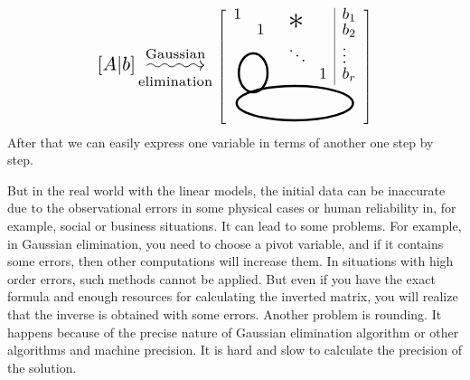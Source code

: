     \[
        \scalebox{1.5}{$[A | b] \overset{\text{Gaussian}}{ \underset{\text{elimination}}{\xymatrix@C=3em{{}\ar@{~>}[r]&{}}}}$}
        \left[\begin{tabular}{clp{0.1cm}p{0.1cm}l}
            \multicolumn{1}{l}{\scalebox{1.25}{$1$}}        &         &\multicolumn{1}{l}{\multirow{2}{*}{\scalebox{2.5}{$\mathlarger{*}$}}}  & \multicolumn{1}{c|}{} & \scalebox{1.25}{$b_1$}    \\
\multicolumn{1}{l}{}         & \scalebox{1.25}{$1$}       & \multicolumn{1}{c}{} & \multicolumn{1}{c|}{}                   & \scalebox{1.25}{$b_2$}    \\
            \multicolumn{2}{c}{\multirow{2}{*}{
                \begin{tikzpicture}[x=0.75pt,y=0.75pt,yscale=-1,xscale=1]
                    \draw  [line width=1.75]  (304.32,138.5) .. controls (312.66,138.5) and (319.43,147.68) .. (319.43,159) .. controls (319.43,170.32) and (312.66,179.5) .. (304.32,179.5) .. controls (295.98,179.5) and (289.21,170.32) .. (289.21,159) .. controls (289.21,147.68) and (295.98,138.5) .. (304.32,138.5) -- cycle ;
                    \end{tikzpicture}
            }} & \scalebox{1.25}{$\ddots$}              & \multicolumn{1}{l|}{}  & \scalebox{1.25}{$\vdots$} \\
            \multicolumn{2}{c}{}                   &                       & \multicolumn{1}{l|}{\scalebox{1.25}{$1$}} & \scalebox{1.25}{$b_r$}    \\[0.05cm]
            \multicolumn{5}{c}{\begin{tikzpicture}[x=0.75pt,y=0.75pt,yscale=-1,xscale=1]
                \draw [line width=1.75]  (246,143.5) .. controls (246,133.56) and (273.41,125.5) .. (307.21,125.5) .. controls (341.02,125.5) and (368.43,133.56) .. (368.43,143.5) .. controls (368.43,153.44) and (341.02,161.5) .. (307.21,161.5) .. controls (273.41,161.5) and (246,153.44) .. (246,143.5) -- cycle ;
                \end{tikzpicture}
                }                                                                        
            \end{tabular}\right]
    \]
    After that we can easily express one variable in terms of another one step by step.
    \par
    But in the real world with the linear models, the initial data can be inaccurate due to the observational errors in some physical cases or human reliability in, for example, social or business situations. It can lead to some problems. For example, in Gaussian elimination, you need to choose a pivot variable, and if it contains some errors, then other computations will increase them. In situations with high order errors, such methods cannot be applied. But even if you have the exact formula and enough resources for calculating the inverted matrix, you will realize that the inverse is obtained with some errors. Another problem is rounding. It happens because of the precise nature of Gaussian elimination algorithm or other algorithms and machine precision. It is hard and slow to calculate the precision of the solution.
